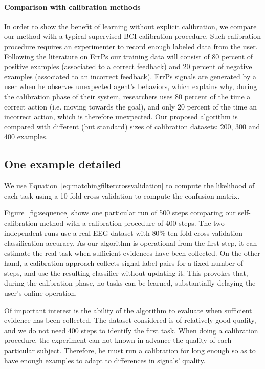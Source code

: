 
\paragraph{Comparison with calibration methods} In order to show the benefit of learning without explicit calibration, we compare our method with a typical supervised BCI calibration procedure. Such calibration procedure requires an experimenter to record enough labeled data from the user. Following the literature on ErrPs \cite{chavarriaga2010learning,iturrate2013task} our training data will consist of 80 percent of positive examples (associated to a correct feedback) and 20 percent of negative examples (associated to an incorrect feedback). ErrPs signals are generated by a user when he observes unexpected agent's behaviors, which explains why, during the calibration phase of their system, researchers uses 80 percent of the time a correct action (i.e. moving towards the goal), and only 20 percent of the time an incorrect action, which is therefore unexpected. Our proposed algorithm is compared with different (but standard) sizes of calibration datasets: 200, 300 and 400 examples.

\subsection{One example detailed}

We use Equation~\ref{eq:matchingfiltercrossvalidation} to compute the likelihood of each task using a 10 fold cross-validation to compute the confusion matrix.

Figure~\ref{fig:sequence} shows one particular run of 500 steps comparing our self-calibration method with a calibration procedure of 400 steps. The two independent runs use a real EEG dataset with $80\%$ ten-fold cross-validation classification accuracy. As our algorithm is operational from the first step, it can estimate the real task when sufficient evidences have been collected. On the other hand, a calibration approach collects signal-label pairs for a fixed number of steps, and use the resulting classifier without updating it. This provokes that, during the calibration phase, no tasks can be learned, substantially delaying the user's online operation. 

Of important interest is the ability of the algorithm to evaluate when sufficient evidence has been collected. The dataset considered is of relatively good quality, and we do not need 400 steps to identify the first task. When doing a calibration procedure, the experiment can not known in advance the quality of each particular subject. Therefore, he must run a calibration for long enough so as to have enough examples to adapt to differences in signals' quality. 

